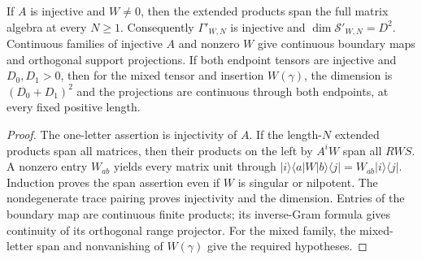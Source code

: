 \begin{lemma}
    \label{thm:mpo_mixed_extended_boundary_rank}
    \leanok
    If $A$ is injective and $W\neq0$, then the extended products span
    the full matrix algebra at every $N\geq1$. Consequently
    $\Gamma'_{W,N}$ is injective and $\dim\mathcal S'_{W,N}=D^2$.
    Continuous families of injective $A$ and nonzero $W$ give continuous
    boundary maps and orthogonal support projections.
    If both endpoint tensors are injective and $D_0,D_1>0$, then for the
    mixed tensor and insertion $W(\gamma)$, the dimension is
    $(D_0+D_1)^2$ and the projections are continuous
    through both endpoints, at every fixed positive length.
\end{lemma}
\begin{proof}
    \leanok
    The one-letter assertion is injectivity of $A$. If the length-$N$
    extended products span all matrices, then their products on the left
    by $A^iW$ span all $RWS$. A nonzero entry $W_{ab}$ yields every
    matrix unit through
    $|i\rangle\langle a|W|b\rangle\langle j|=W_{ab}|i\rangle\langle j|$.
    Induction proves the span assertion even if $W$ is singular or nilpotent.
    The nondegenerate trace pairing proves injectivity and the dimension.
    Entries of the boundary map are continuous finite products; its
    inverse-Gram formula gives continuity of its orthogonal range projector.
    For the mixed family, the mixed-letter span and nonvanishing of
    $W(\gamma)$ give the required hypotheses.
\end{proof}

